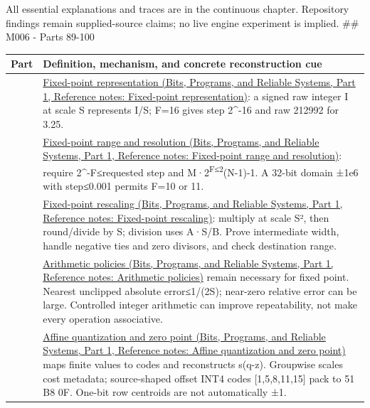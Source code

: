 All essential explanations and traces are in the continuous chapter. Repository findings remain supplied-source claims; no live engine experiment is implied. \#\# M006 - Parts 89-100

{\def\LTcaptype{none} %
\begin{longtable}[]{@{}
  >{\raggedright\arraybackslash}p{}
  >{\raggedright\arraybackslash}p{}@{}}
\toprule\noalign{}
\begin{minipage}[b]{\linewidth}\raggedright
Part
\end{minipage} & \begin{minipage}[b]{\linewidth}\raggedright
Definition, mechanism, and concrete reconstruction cue
\end{minipage} \\
\midrule\noalign{}
\endhead
\bottomrule\noalign{}
\endlastfoot
89 & \href{../01-Bits-Programs-and-Reliable-Systems-P01/main.pdf\#appendix-1d0dbe8924cc}{Fixed-point representation (Bits, Programs, and Reliable Systems, Part 1, Reference notes: Fixed-point representation)}: a signed raw integer I at scale S represents I/S; F=16 gives step 2\^{}-16 and raw 212992 for 3.25. \\
90 & \href{../01-Bits-Programs-and-Reliable-Systems-P01/main.pdf\#appendix-ceb4c4a9b5a1}{Fixed-point range and resolution (Bits, Programs, and Reliable Systems, Part 1, Reference notes: Fixed-point range and resolution)}: require 2\^{}-F≤requested step and M·2\textsuperscript{F≤2}(N-1)-1. A 32-bit domain ±1e6 with step≤0.001 permits F=10 or 11. \\
91 & \href{../01-Bits-Programs-and-Reliable-Systems-P01/main.pdf\#appendix-3333db47830f}{Fixed-point rescaling (Bits, Programs, and Reliable Systems, Part 1, Reference notes: Fixed-point rescaling)}: multiply at scale S², then round/divide by S; division uses A·S/B. Prove intermediate width, handle negative ties and zero divisors, and check destination range. \\
92 & \href{../01-Bits-Programs-and-Reliable-Systems-P01/main.pdf\#appendix-2ed044358b82}{Arithmetic policies (Bits, Programs, and Reliable Systems, Part 1, Reference notes: Arithmetic policies)} remain necessary for fixed point. Nearest unclipped absolute error≤1/(2S); near-zero relative error can be large. Controlled integer arithmetic can improve repeatability, not make every operation associative. \\
93 & \href{../01-Bits-Programs-and-Reliable-Systems-P01/main.pdf\#appendix-d5da3eaabaef}{Affine quantization and zero point (Bits, Programs, and Reliable Systems, Part 1, Reference notes: Affine quantization and zero point)} maps finite values to codes and reconstructs s(q-z). Groupwise scales cost metadata; source-shaped offset INT4 codes {[}1,5,8,11,15{]} pack to 51 B8 0F. One-bit row centroids are not automatically ±1. \\

\end{longtable}}
